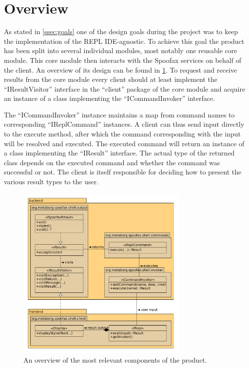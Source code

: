 \section{Overview}
\label{sec:overview}

As stated in \cref{ssec:goals} one of the design goals during the project was
to keep the implementation of the REPL IDE-agnostic. To achieve this goal the
product has been split into several individual modules, most notably one
reusable core module. This core module then interacts with the Spoofax services
on behalf of the client. An overview of its design can be found in
\cref{fig:uml-overview}. To request and receive results from the core module
every client should at least implement the ``IResultVisitor'' interface in the
``client'' package of the core module and acquire an instance of a class
implementing the ``ICommandInvoker'' interface.

The ``ICommandInvoker'' instance maintains a map from command names to
corresponding ``IReplCommand'' instances. A client can thus send input directly
to the execute method, after which the command corresponding with the input
will be resolved and executed. The executed command will return an instance of
a class implementing the ``IResult'' interface. The actual type of the returned
class depends on the executed command and whether the command was successful or
not. The client is itself responsible for deciding how to present the various
result types to the user.

\begin{figure}[h!]
  \centering
  \includegraphics[width=0.75\textwidth]{uml-overview}
  \caption{An overview of the most relevant components of the product.}
  \label{fig:uml-overview}
\end{figure}
